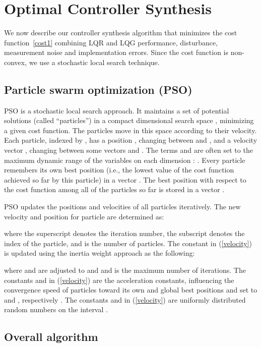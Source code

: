 \documentclass{amsart}
\numberwithin{equation}{section}
\begin{document}
\section{Optimal Controller Synthesis}
We now describe our controller synthesis algorithm that minimizes the cost function~\eqref{cost1}
combining LQR and LQG performance, disturbance, measurement noise and implementation errors.
Since the cost function is non-convex, we use a stochastic local search technique.

\subsection{Particle swarm optimization (PSO)}\label{PSO}
PSO is a stochastic local search approach.
It maintains a set of potential solutions (called ``particles'')
in a compact  dimensional search space , minimizing a given cost function.
The particles move in this space according to their velocity.
Each particle, indexed by , has a position , changing between  and , and a velocity vector , changing between some vectors  and . 
The terms  and  are often set to the maximum dynamic range of the variables on each dimension \cite{majid}: . 
Every particle remembers its own best position (i.e., the lowest value of the cost function achieved so far by this particle) in a 
vector .
The best position with respect to the cost function among all of the particles 
so far is stored in a vector .

PSO updates the positions and velocities of all particles iteratively.
The new velocity and position for particle  are determined as:

where the superscript  denotes the iteration number, the subscript
 denotes the index of the particle, and  is the number of particles. 
The constant  in (\ref{velocity}) is updated using the inertia weight approach \cite{ebbesen} as the following:
 
where  and  are adjusted to  and  and  is the maximum number of iterations. 
The constants  and  in (\ref{velocity}) are the acceleration constants, influencing the convergence speed of particles toward its own and global best positions
and set to  and , respectively \cite{ebbesen}. 
The constants  and  in (\ref{velocity}) are uniformly distributed random numbers on the interval .

\subsection{Overall algorithm} \label{algorithm}
\end{document}
